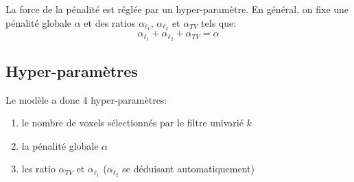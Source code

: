 La force de la pénalité est réglée par un hyper-paramètre.
En général, on fixe une pénalité globale $\alpha$ et des ratios $\alpha_{\ell_1}$, $\alpha_{\ell_2}$ et $\alpha_{TV}$ tels que:
\[
\alpha_{\ell_1} + \alpha_{\ell_2} + \alpha_{TV} = \alpha
\]

\subsection{Hyper-paramètres}

Le modèle a donc 4 hyper-paramètres:
\begin{enumerate}
 \item le nombre de voxels sélectionnés par le filtre univarié $k$
 \item la pénalité globale $\alpha$
 \item les ratio $\alpha_{TV}$ et $\alpha_{\ell_1}$ ($\alpha_{\ell_2}$ se déduisant automatiquement)
\end{enumerate}
